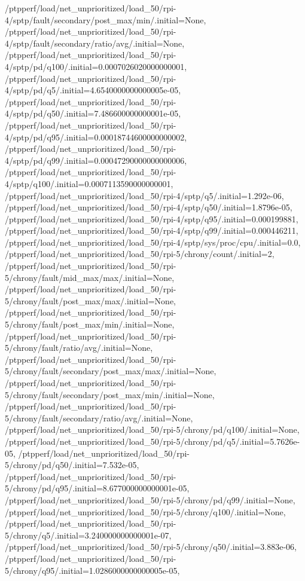{    /ptpperf/load/net_unprioritized/load_50/rpi-4/sptp/fault/secondary/post_max/min/.initial=None,
    /ptpperf/load/net_unprioritized/load_50/rpi-4/sptp/fault/secondary/ratio/avg/.initial=None,
    /ptpperf/load/net_unprioritized/load_50/rpi-4/sptp/pd/q100/.initial=0.0007026020000000001,
    /ptpperf/load/net_unprioritized/load_50/rpi-4/sptp/pd/q5/.initial=4.6540000000000005e-05,
    /ptpperf/load/net_unprioritized/load_50/rpi-4/sptp/pd/q50/.initial=7.486600000000001e-05,
    /ptpperf/load/net_unprioritized/load_50/rpi-4/sptp/pd/q95/.initial=0.00018744600000000002,
    /ptpperf/load/net_unprioritized/load_50/rpi-4/sptp/pd/q99/.initial=0.00047290000000000006,
    /ptpperf/load/net_unprioritized/load_50/rpi-4/sptp/q100/.initial=0.0007113590000000001,
    /ptpperf/load/net_unprioritized/load_50/rpi-4/sptp/q5/.initial=1.292e-06,
    /ptpperf/load/net_unprioritized/load_50/rpi-4/sptp/q50/.initial=1.8796e-05,
    /ptpperf/load/net_unprioritized/load_50/rpi-4/sptp/q95/.initial=0.000199881,
    /ptpperf/load/net_unprioritized/load_50/rpi-4/sptp/q99/.initial=0.000446211,
    /ptpperf/load/net_unprioritized/load_50/rpi-4/sptp/sys/proc/cpu/.initial=0.0,
    /ptpperf/load/net_unprioritized/load_50/rpi-5/chrony/count/.initial=2,
    /ptpperf/load/net_unprioritized/load_50/rpi-5/chrony/fault/mid_max/max/.initial=None,
    /ptpperf/load/net_unprioritized/load_50/rpi-5/chrony/fault/post_max/max/.initial=None,
    /ptpperf/load/net_unprioritized/load_50/rpi-5/chrony/fault/post_max/min/.initial=None,
    /ptpperf/load/net_unprioritized/load_50/rpi-5/chrony/fault/ratio/avg/.initial=None,
    /ptpperf/load/net_unprioritized/load_50/rpi-5/chrony/fault/secondary/post_max/max/.initial=None,
    /ptpperf/load/net_unprioritized/load_50/rpi-5/chrony/fault/secondary/post_max/min/.initial=None,
    /ptpperf/load/net_unprioritized/load_50/rpi-5/chrony/fault/secondary/ratio/avg/.initial=None,
    /ptpperf/load/net_unprioritized/load_50/rpi-5/chrony/pd/q100/.initial=None,
    /ptpperf/load/net_unprioritized/load_50/rpi-5/chrony/pd/q5/.initial=5.7626e-05,
    /ptpperf/load/net_unprioritized/load_50/rpi-5/chrony/pd/q50/.initial=7.532e-05,
    /ptpperf/load/net_unprioritized/load_50/rpi-5/chrony/pd/q95/.initial=8.677000000000001e-05,
    /ptpperf/load/net_unprioritized/load_50/rpi-5/chrony/pd/q99/.initial=None,
    /ptpperf/load/net_unprioritized/load_50/rpi-5/chrony/q100/.initial=None,
    /ptpperf/load/net_unprioritized/load_50/rpi-5/chrony/q5/.initial=3.240000000000001e-07,
    /ptpperf/load/net_unprioritized/load_50/rpi-5/chrony/q50/.initial=3.883e-06,
    /ptpperf/load/net_unprioritized/load_50/rpi-5/chrony/q95/.initial=1.0286000000000005e-05,
}

